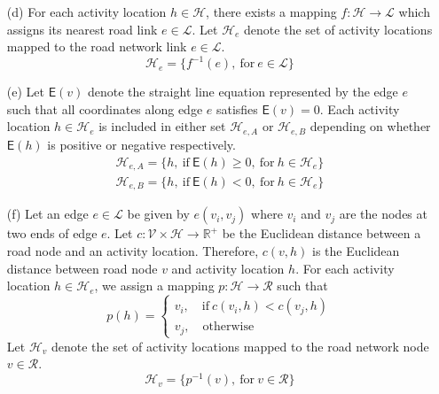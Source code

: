 \begin{enumerate}
	\item[(d)] For each activity location $h\in\mathcal{H}$, there exists a mapping $f:\mathcal{H}\rightarrow\mathcal{L}$ which assigns its nearest road link $e\in\mathcal{L}$. Let $\mathcal{H}_e$ denote the set of activity locations mapped to the road network link $e\in\mathcal{L}$.
	\begin{equation}\mathcal{H}_e=\{f^{-1}(e),\ \textrm{for}\ e\in\mathcal{L}\}\end{equation}
	
	\item[(e)] Let $\mathsf{E}(v)$ denote the straight line equation represented by the edge $e$ such that all coordinates along edge $e$ satisfies $\mathsf{E}(v)=0$. Each activity location $h\in\mathcal{H}_e$ is included in either set $\mathcal{H}_{e,A}$ or $\mathcal{H}_{e,B}$ depending on whether $\mathsf{E}(h)$ is positive or negative respectively.
	\begin{equation}
	\begin{aligned}
	\mathcal{H}_{e,A}=\{h,\ \textrm{if}\ \mathsf{E}(h)\geq 0,\ \textrm{for}\ h\in\mathcal{H}_e\}\\
	\mathcal{H}_{e,B}=\{h,\ \textrm{if}\ \mathsf{E}(h)< 0,\ \textrm{for}\ h\in\mathcal{H}_e\}
	\end{aligned}
	\end{equation}
	
	\item[(f)] Let an edge $e\in\mathcal{L}$ be given by $e(v_i,v_j)$ where $v_i$ and $v_j$ are the nodes at two ends of edge $e$. Let $c:\mathcal{V}\times\mathcal{H}\rightarrow\mathbb{R}^{+}$ be the Euclidean distance between a road node and an activity location. Therefore, $c(v,h)$ is the Euclidean distance between road node $v$ and activity location $h$. For each activity location $h\in\mathcal{H}_{e}$, we assign a mapping $p:\mathcal{H}\rightarrow\mathcal{R}$ such that
	\begin{equation}
	p(h)=
	\begin{cases}
	v_i,\quad \textrm{if}\ c(v_i,h)<c(v_j,h)\\
	v_j,\quad \textrm{otherwise}
	\end{cases}
	\end{equation}
	Let $\mathcal{H}_v$ denote the set of activity locations mapped to the road network node $v\in\mathcal{R}$.
	\begin{equation}
	\mathcal{H}_v=\{p^{-1}(v),\ \textrm{for}\ v\in\mathcal{R}\}
	\end{equation}
\end{enumerate}

